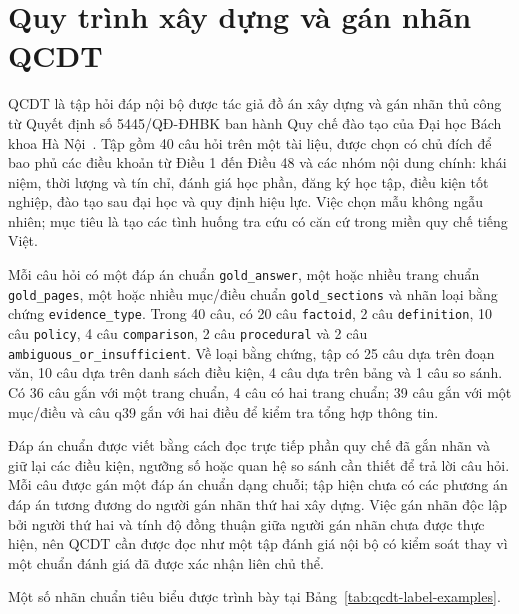 \documentclass[../DoAn.tex]{subfiles}
\begin{document}
\appendix
\chapter{Quy trình xây dựng và gán nhãn QCDT}
\label{appendix:qcdt-construction-labeling}

QCDT là tập hỏi đáp nội bộ được tác giả đồ án xây dựng và gán nhãn thủ công từ
Quyết định số 5445/QĐ-ĐHBK ban hành Quy chế đào tạo của Đại học Bách khoa Hà
Nội~\cite{hust2025trainingregulation}. Tập gồm 40 câu hỏi trên một tài liệu,
được chọn có chủ đích để bao phủ các điều khoản từ Điều 1 đến Điều 48 và các
nhóm nội dung chính: khái niệm, thời lượng và tín chỉ, đánh giá học phần, đăng
ký học tập, điều kiện tốt nghiệp, đào tạo sau đại học và quy định hiệu lực. Việc
chọn mẫu không ngẫu nhiên; mục tiêu là tạo các tình huống tra cứu có căn cứ trong
miền quy chế tiếng Việt.

Mỗi câu hỏi có một đáp án chuẩn \texttt{gold\_answer}, một hoặc nhiều trang
chuẩn \texttt{gold\_pages}, một hoặc nhiều mục/điều chuẩn \texttt{gold\_sections}
và nhãn loại bằng chứng \texttt{evidence\_type}. Trong 40 câu, có 20 câu
\texttt{factoid}, 2 câu \texttt{definition}, 10 câu \texttt{policy}, 4 câu
\texttt{comparison}, 2 câu \texttt{procedural} và 2 câu
\texttt{ambiguous\_or\_insufficient}. Về loại bằng chứng, tập có 25 câu dựa
trên đoạn văn, 10 câu dựa trên danh sách điều kiện, 4 câu dựa trên bảng và 1 câu
so sánh. Có 36 câu gắn với một trang chuẩn, 4 câu có hai trang chuẩn; 39 câu gắn
với một mục/điều và câu q39 gắn với hai điều để kiểm tra tổng hợp thông tin.

Đáp án chuẩn được viết bằng cách đọc trực tiếp phần quy chế đã gắn nhãn và giữ
lại các điều kiện, ngưỡng số hoặc quan hệ so sánh cần thiết để trả lời câu hỏi.
Mỗi câu được gán một đáp án chuẩn dạng chuỗi; tập hiện chưa có các phương án đáp
án tương đương do người gán nhãn thứ hai xây dựng. Việc gán nhãn độc lập bởi
người thứ hai và tính độ đồng thuận giữa người gán nhãn chưa được thực hiện, nên
QCDT cần được đọc như một tập đánh giá nội bộ có kiểm soát thay vì một chuẩn
đánh giá đã được xác nhận liên chủ thể.

Một số nhãn chuẩn tiêu biểu được trình bày tại
Bảng~\ref{tab:qcdt-label-examples}.
\end{document}
